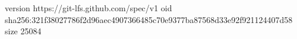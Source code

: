 version https://git-lfs.github.com/spec/v1
oid sha256:321f38027786f2d96aec4907366485c70e9377ba87568d33e92f921124407d58
size 25084
